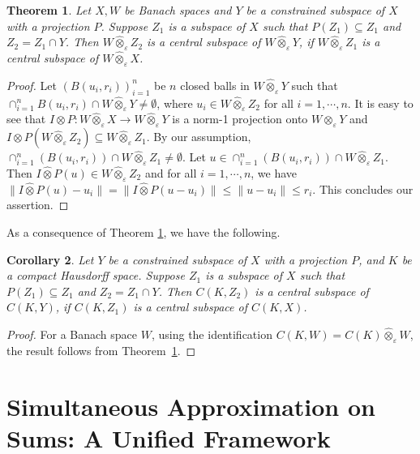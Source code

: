 \documentclass[11pt]{amsart}
\newtheorem{thm}{Theorem}[section]
\newtheorem{cor}[thm]{Corollary}
\newcommand{\ra}{\rightarrow}
\newcommand{\es}{\emptyset}
\newcommand{\ci}{\subseteq}
\newcommand{\e}{\varepsilon}
\newcommand{\otm}{\otimes}
\begin{document}
\begin{thm}\label{T5}
Let $X,W$ be Banach spaces and $Y$ be a constrained subspace of $X$ with a projection $P$. Suppose $Z_1$ is a subspace of $X$ such that $P(Z_1)\ci Z_1$ and $Z_2=Z_1\cap Y$. Then $W\hat{\otimes}_\e Z_2$ is a central subspace of $W\hat{\otimes}_\e Y$, if $W\hat{\otimes}_\e Z_1$ is a central subspace of $W\hat{\otimes}_\e X$. 
\end{thm}
\begin{proof}
Let $(B(u_i,r_i))_{i=1}^n$ be $n$ closed balls in $W\hat{\otimes}_\e Y$ such that $\cap_{i=1}^nB(u_i,r_i)\cap W\hat{\otm}_\e Y\neq\es$, where $u_i\in W\hat{\otimes}_\e Z_2$ for all $i=1,\cdots,n$. It is easy to see that $I\otm P:W\hat{\otm}_\e X\ra W\hat{\otm}_\e Y$ is a norm-1 projection onto $W\hat{\otm}_\e Y$ and $I\otm P(W\hat{\otm}_\e Z_2)\ci W\hat{\otm}_\e Z_1$. By our assumption, $\cap_{i=1}^n(B(u_i,r_i))\cap W\hat{\otm}_\e Z_1\neq\es$. Let $u\in \cap_{i=1}^n(B(u_i,r_i))\cap W\hat{\otm}_\e Z_1$. Then $I\hat{\otm}P(u)\in W\hat{\otm}_\e Z_2$ and for all $i=1,\cdots,n$, we have $\|I\hat{\otm}P(u)-u_i\|=\|I\hat{\otm}P(u-u_i)\|\leq\|u-u_i\|\leq r_i$. This concludes our assertion.
\end{proof}
As a consequence of Theorem \ref{T5}, we have the following.
\begin{cor}
Let $Y$ be a constrained subspace of $X$  with a projection $P$, and $K$ be a compact Hausdorff space. Suppose $Z_1$ is a subspace of $X$ such that $P(Z_1)\ci Z_1$ and $Z_2=Z_1\cap Y$. Then $C(K,Z_2)$ is a central subspace of $C(K,Y)$,    if $C(K,Z_1)$ is a central subspace of $C(K,X)$.
\end{cor}
\begin{proof}
For a Banach space $W$, using the identification $C(K,W)=C(K)\hat{\otm}_\e W$, the result follows from Theorem~\ref{T5}.
\end{proof}











\section{Simultaneous Approximation on Sums: A Unified Framework}
\end{document}
